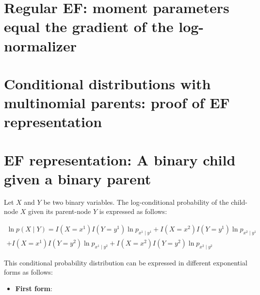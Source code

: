 \documentclass[11pt, oneside]{article}   	%
\numberwithin{figure}{section}
\numberwithin{equation}{section}
\numberwithin{table}{section}
\theoremstyle{definition}
\begin{document}
\begin{appendices}


\section{Regular EF: moment parameters equal the gradient of the log-normalizer}\label{appendix:regularEFequality}

\section{Conditional distributions with multinomial parents: proof of EF representation}\label{appendix:CD_With_MParents:Representation}

\section{EF representation: A binary child given a binary parent}

Let $X$ and $Y$ be two binary variables. The log-conditional probability of the child-node $X$ given its parent-node $Y$ is expressed as follows:

\begin{eqnarray*}
\ln p(X \mid Y) =  I(X= x^1) I(Y= y^1) \ln p_{x^1 \mid y^1} + I(X=x^2) I(Y= y^1) \ln p_{x^2 \mid y^1} \\
+ I(X=x^1) I(Y= y^2) \ln p_{x^1 \mid y^2} + I(X=x^2) I(Y= y^2) \ln p_{x^2 \mid y^2}
\end{eqnarray*}

This conditional probability distribution can be expressed in different exponential forms as follows:


\begin{itemize}

\item \textbf{First form}:


\end{itemize}
\end{appendices}
\end{document}
